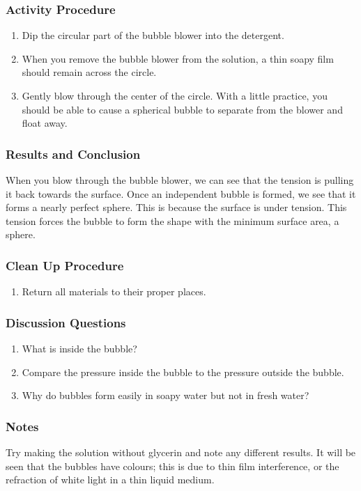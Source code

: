 \subsubsection*{Activity Procedure}
\begin{enumerate}
\item{Dip the circular part of the bubble blower into the detergent.}
\item{When you remove the bubble blower from the solution, a thin soapy film should remain across the circle.}
\item{Gently blow through the center of the circle. With a little practice, you should be able to cause a spherical bubble to separate from the blower and float away.}
\end{enumerate}

\subsubsection*{Results and Conclusion}
When you blow through the bubble blower, we can see that the tension is pulling it back towards the surface. Once an independent bubble is formed, we see that it forms a nearly perfect sphere. This is because the surface is under tension. This tension forces the bubble to form the shape with the minimum surface area, a sphere.

\subsubsection*{Clean Up Procedure}
\begin{enumerate}
\item{Return all materials to their proper places.}
\end{enumerate}

\subsubsection*{Discussion Questions}
\begin{enumerate}
\item{What is inside the bubble?}
\item{Compare the pressure inside the bubble to the pressure outside the bubble.}
\item{Why do bubbles form easily in soapy water but not in fresh water?}
\end{enumerate}

\subsubsection*{Notes}
Try making the solution without glycerin and note any different results. It will be seen that the bubbles have colours; this is due to thin film interference, or the refraction of white light in a thin liquid medium.

